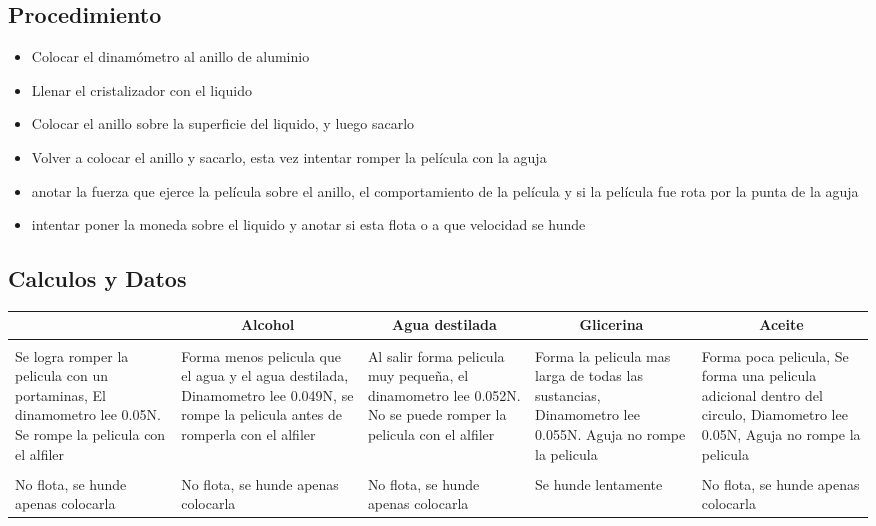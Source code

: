 \documentclass[11pt, letterpaper]{article}
\begin{document}
\subsection{Procedimiento}
\begin{itemize}
	\item Colocar el dinamómetro al anillo de aluminio
	\item Llenar el cristalizador con el liquido
	\item Colocar el anillo sobre la superficie del liquido, y luego sacarlo
	\item Volver a colocar el anillo y sacarlo, esta vez intentar romper la película con la aguja
	\item anotar la fuerza que ejerce la película sobre el anillo, el comportamiento de la película y si la película fue rota por la punta de la aguja
	\item intentar poner la moneda sobre el liquido y anotar si esta flota o a que velocidad se hunde
\end{itemize}
\subsection{Calculos y Datos}
\begin{center}
    \begin{tabular}{|p{7.5em}|p{7.5em}|p{7.5em}|p{7.5em}|p{7.5em}|}
    \toprule
    \rowcolor[rgb]{ .776,  .878,  .706} \multicolumn{1}{|c|}{Agua} & \multicolumn{1}{|c|}{Alcohol} & \multicolumn{1}{|c|}{Agua destilada} & \multicolumn{1}{|c|}{Glicerina} & \multicolumn{1}{|c|}{Aceite} \\
    \midrule
    \rowcolor[rgb]{ 1,  1,  0} \multicolumn{5}{|c|}{Hoja circular} \\
    \midrule
    Se logra romper la pelicula con un portaminas, El dinamometro lee 0.05N. Se rompe la pelicula con el alfiler & Forma menos pelicula que el agua y el agua destilada, Dinamometro lee 0.049N, se rompe la pelicula antes de romperla con el alfiler & Al salir forma pelicula muy pequeña, el dinamometro lee 0.052N. No se puede romper la pelicula con el alfiler & Forma la pelicula mas larga de todas las sustancias, Dinamometro lee 0.055N. Aguja no rompe la pelicula & Forma poca pelicula, Se forma una pelicula adicional dentro del circulo, Diamometro lee 0.05N, Aguja no rompe la pelicula \\
    \midrule
    \rowcolor[rgb]{ 1,  1,  0} \multicolumn{5}{|c|}{Moneda} \\
    \midrule
    No flota, se hunde apenas colocarla  & No flota, se hunde apenas colocarla  & No flota, se hunde apenas colocarla  & Se hunde lentamente & No flota, se hunde apenas colocarla  \\
    \bottomrule
    \end{tabular}%
\end{center}
\end{document}
